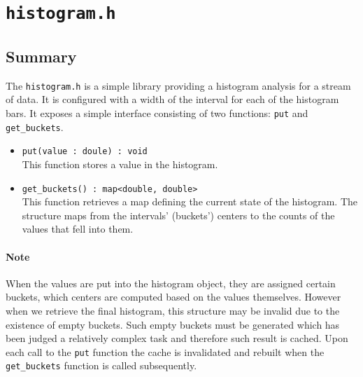 
\section{\texttt{histogram.h}}

	\subsection{Summary}
	The \texttt{histogram.h} is a simple library providing a histogram
	analysis for a stream of data. It is configured with a width of the
	interval for each of the histogram bars. It exposes a simple interface
	consisting of two functions: \texttt{put} and \texttt{get\_buckets}.

	\begin{itemize}
		\item \texttt{put(value : doule) : void}\\
			This function stores a value in the histogram.
		\item \texttt{get\_buckets() : map<double, double>}\\
			This function retrieves a map defining the current state
			of the histogram. The structure maps from the intervals'
			(buckets') centers to the counts of the values that fell
			into them.
	\end{itemize}

	\paragraph{Note}
	When the values are put into the histogram object, they are assigned 
	certain buckets, which centers are computed based on the values themselves.
	However when we retrieve the final histogram, this structure may be invalid
	due to the existence of empty buckets. Such empty buckets must be generated
	which has been judged a relatively complex task and therefore such result is
	cached. Upon each call to the \texttt{put} function the cache is invalidated
	and rebuilt when the \texttt{get\_buckets} function is called subsequently.

